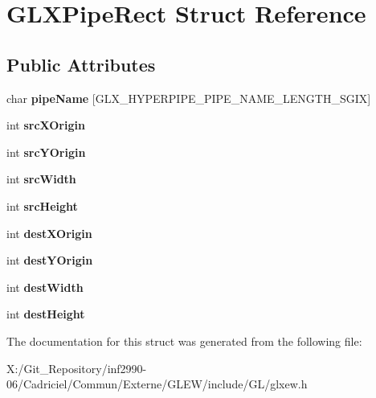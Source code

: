 \hypertarget{struct_g_l_x_pipe_rect}{\section{G\-L\-X\-Pipe\-Rect Struct Reference}
\label{struct_g_l_x_pipe_rect}
}
\subsection*{Public Attributes}
\begin{DoxyCompactItemize}
\item 
\hypertarget{struct_g_l_x_pipe_rect_aa4c4f60e9647705ddefa10f95a37cb79}{char {\bfseries pipe\-Name} \mbox{[}G\-L\-X\-\_\-\-H\-Y\-P\-E\-R\-P\-I\-P\-E\-\_\-\-P\-I\-P\-E\-\_\-\-N\-A\-M\-E\-\_\-\-L\-E\-N\-G\-T\-H\-\_\-\-S\-G\-I\-X\mbox{]}}\label{struct_g_l_x_pipe_rect_aa4c4f60e9647705ddefa10f95a37cb79}

\item 
\hypertarget{struct_g_l_x_pipe_rect_a9df2313c01f75d149e64f2ff467bc266}{int {\bfseries src\-X\-Origin}}\label{struct_g_l_x_pipe_rect_a9df2313c01f75d149e64f2ff467bc266}

\item 
\hypertarget{struct_g_l_x_pipe_rect_a1f7316dff7050ab2ce9d3d37f8c5450e}{int {\bfseries src\-Y\-Origin}}\label{struct_g_l_x_pipe_rect_a1f7316dff7050ab2ce9d3d37f8c5450e}

\item 
\hypertarget{struct_g_l_x_pipe_rect_a2c6c180a4dabb71076366e06a1c7d0ef}{int {\bfseries src\-Width}}\label{struct_g_l_x_pipe_rect_a2c6c180a4dabb71076366e06a1c7d0ef}

\item 
\hypertarget{struct_g_l_x_pipe_rect_a35632524bce6bffa05f284a9b1c1b8ff}{int {\bfseries src\-Height}}\label{struct_g_l_x_pipe_rect_a35632524bce6bffa05f284a9b1c1b8ff}

\item 
\hypertarget{struct_g_l_x_pipe_rect_a8b7b941894ad3420326d7e9fa885bb71}{int {\bfseries dest\-X\-Origin}}\label{struct_g_l_x_pipe_rect_a8b7b941894ad3420326d7e9fa885bb71}

\item 
\hypertarget{struct_g_l_x_pipe_rect_aef7766b02ef07c20a11e89da5878b469}{int {\bfseries dest\-Y\-Origin}}\label{struct_g_l_x_pipe_rect_aef7766b02ef07c20a11e89da5878b469}

\item 
\hypertarget{struct_g_l_x_pipe_rect_a3c07991d2a8fb6e973eae834650b3dad}{int {\bfseries dest\-Width}}\label{struct_g_l_x_pipe_rect_a3c07991d2a8fb6e973eae834650b3dad}

\item 
\hypertarget{struct_g_l_x_pipe_rect_a858b0ea6642e451495aff35cfefbd083}{int {\bfseries dest\-Height}}\label{struct_g_l_x_pipe_rect_a858b0ea6642e451495aff35cfefbd083}

\end{DoxyCompactItemize}


The documentation for this struct was generated from the following file\-:\begin{DoxyCompactItemize}
\item 
X\-:/\-Git\-\_\-\-Repository/inf2990-\/06/\-Cadriciel/\-Commun/\-Externe/\-G\-L\-E\-W/include/\-G\-L/glxew.\-h\end{DoxyCompactItemize}
